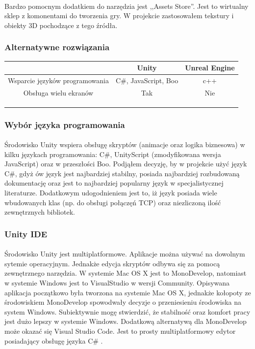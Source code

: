 \documentclass[12pt]{article}
\begin{document}
{\paragraph{}
Bardzo pomocnym dodatkiem do narzędzia jest ,,Assets Store''. Jest to wirtualny sklep z komonentami do tworzenia gry. W projekcie zastosowałem tekstury i obiekty 3D pochodzące z tego źródła.
\subsubsection{Alternatywne rozwiązania}
 \begin{tabular}{|c|c|c|}
 \hline
 \ & Unity & Unreal Engine \\ 
  \hline
 Wsparcie języków programowania & C\#, JavaScript, Boo & c++ \\  
  \hline
 Obsługa wielu ekranów & Tak & Nie \\
 \hline  
  &  &  \\
  \hline   
  &  &  \\
  \hline   
  &  &  \\
  \hline   
\end{tabular}

\subsubsection{Wybór języka programowania}
\paragraph{}
Środowisko Unity wspiera obsługę skryptów (animacje oraz logika biznesowa) w kilku językach programowania: C\#, UnityScript (zmodyfikowana wersja JavaScript)  oraz w przeszłości Boo. Podjąłem decyzję, by w projekcie użyć język C\#, gdyż ów język jest najbardziej stabilny, posiada najbardziej rozbudowaną dokumentację oraz jest to najbardziej popularny język w specjalistycznej literaturze. Dodatkowym udogodnieniem  jest to, iż  język posiada wiele wbudowanych klas (np. do obsługi połączęń TCP) oraz niezliczoną ilość zewnętrznych bibliotek.
\subsubsection{Unity IDE}
\paragraph{}
Środowisko Unity jest multiplatformowe. Aplikacje można używać na dowolnym sytemie operacyjnym. Jednakże edycja skryptów odbywa się za pomocą zewnętrznego narzędzia. W systemie Mac OS X jest to MonoDevelop, natomiast w systemie Windows jest to VisualStudio w wersji Community. Opisywana aplikacja początkowo była tworzona na systemie Mac OS X, jednakże kołopoty ze środowiskiem MonoDevelop spowodwały decyzje o przeniesieniu środowiska na system Windows. Subiektywnie mogę stwierdzić, że stabilność oraz komfort pracy jest dużo lepszy w systemie Windows.
Dodatkową alternatywą dla MonoDevelop może okazać się Visual Studio Code. Jest to prosty multiplatformowy edytor posiadający obsługę języka C\# .

}
\end{document}
